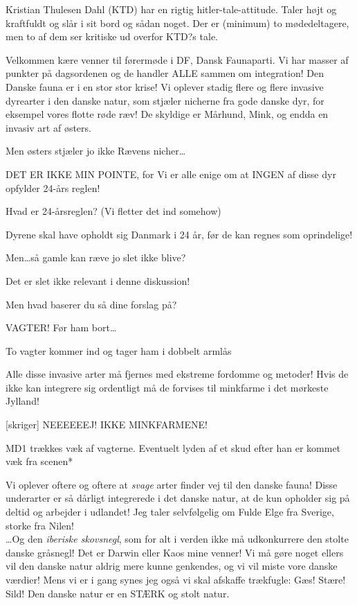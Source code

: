 \documentclass[a4paper,12pt]{article}
\begin{document}
\begin{sketch}

\scene Kristian Thulesen Dahl (KTD) har en rigtig hitler-tale-attitude. Taler højt og kraftfuldt og slår i sit bord og sådan noget. Der er (minimum) to mødedeltagere, men to af dem ser kritiske ud overfor KTD?s tale.

 Velkommen kære venner til førermøde i DF, Dansk Faunaparti. Vi har masser af punkter på dagsordenen og de handler ALLE sammen om integration! 
Den Danske fauna er i en stor stor krise! Vi oplever stadig flere og flere invasive dyrearter i den danske natur, som stjæler nicherne fra gode danske dyr, for eksempel vores flotte røde ræv! De skyldige er Mårhund, Mink, og endda en invasiv art af østers.

 Men østers stjæler jo ikke Rævens nicher\ldots

 DET ER IKKE MIN POINTE, for Vi er alle enige om at INGEN af disse dyr opfylder 24-års reglen!

 Hvad er 24-årsreglen? (Vi fletter det ind somehow)

 Dyrene skal have opholdt sig Danmark i 24 år, før de kan regnes som oprindelige!

 Men\ldots så gamle kan ræve jo slet ikke blive?

 Det er slet ikke relevant i denne diskussion!

 Men hvad baserer du så dine forslag på?

 VAGTER! Før ham bort\ldots

\scene To vagter kommer ind og tager ham i dobbelt armlås

Alle disse invasive arter må fjernes med ekstreme fordomme og metoder! Hvis de ikke kan integrere sig ordentligt må de forvises til minkfarme i det mørkeste Jylland!

[skriger] NEEEEEEJ! IKKE MINKFARMENE!

\scene MD1 trækkes væk af vagterne. Eventuelt lyden af et skud efter han er kommet væk fra scenen* 

Vi oplever oftere og oftere at \emph{svage} arter finder vej til den danske fauna! Disse underarter er så dårligt integrerede i det danske natur, at de kun opholder sig på deltid og arbejder i udlandet! Jeg taler selvfølgelig om Fulde Elge fra Sverige, storke fra Nilen! \\
 \ldots Og den \emph{iberiske skovsnegl}, som for alt i verden ikke må udkonkurrere den stolte danske gråsnegl! Det er Darwin eller Kaos mine venner! Vi må gøre noget ellers vil den danske natur aldrig mere kunne genkendes, og vi vil miste vore danske værdier! Mens vi er i gang synes jeg også vi skal afskaffe trækfugle: Gæs! Stære! Sild! Den danske natur er en STÆRK og stolt natur.


\end{sketch}
\end{document}

